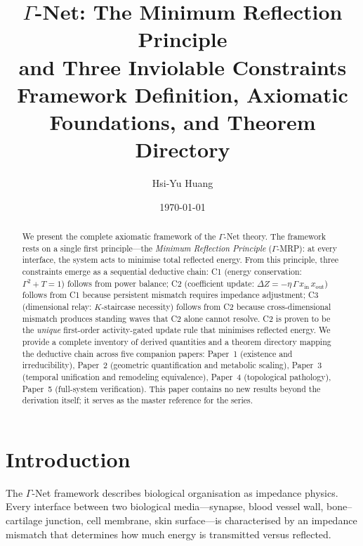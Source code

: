 \documentclass[aps,pre,twocolumn,superscriptaddress,floatfix]{revtex4-2}
\begin{document}
\title{$\Gamma$-Net: The Minimum Reflection Principle\\
and Three Inviolable Constraints\\[4pt]
\small Framework Definition, Axiomatic Foundations,
and Theorem Directory}

\author{Hsi-Yu Huang}

\date{\today}

\begin{abstract}
We present the complete axiomatic framework of the
$\Gamma$-Net theory.
The framework rests on a single first principle---the
\emph{Minimum Reflection Principle} ($\Gamma$-MRP):
at every interface, the system acts to minimise
total reflected energy.
From this principle, three constraints emerge as a
sequential deductive chain:
C1 (energy conservation: $\Gamma^2 + T = 1$)
follows from power balance;
C2 (coefficient update: $\Delta Z = -\eta\,\Gamma\,
x_{\text{in}}\,x_{\text{out}}$)
follows from C1 because persistent mismatch
requires impedance adjustment;
C3 (dimensional relay: $K$-staircase necessity)
follows from C2 because cross-dimensional mismatch
produces standing waves that C2 alone cannot resolve.
C2 is proven to be the \emph{unique} first-order
activity-gated update rule that minimises reflected energy.
We provide a complete inventory of derived quantities
and a theorem directory mapping the deductive chain
across five companion papers:
Paper~1 (existence and irreducibility),
Paper~2 (geometric quantification and metabolic scaling),
Paper~3 (temporal unification and remodeling equivalence),
Paper~4 (topological pathology),
Paper~5 (full-system verification).
This paper contains no new results beyond the derivation
itself; it serves as the master reference for the series.
\end{abstract}

\maketitle

\section{Introduction}
\label{sec:intro}

The $\Gamma$-Net framework describes biological
organisation as impedance physics.
Every interface between two biological media---synapse,
blood vessel wall, bone--cartilage junction, cell
membrane, skin surface---is characterised by an
impedance mismatch that determines how much energy
is transmitted versus reflected.
\end{document}

